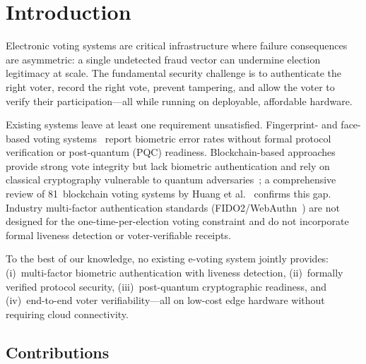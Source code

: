 \documentclass[pdflatex,sn-mathphys-num]{sn-jnl}%
\theoremstyle{thmstyleone}%
\theoremstyle{thmstyletwo}%
\theoremstyle{thmstylethree}%
\begin{document}

\maketitle

\section{Introduction}\label{sec:intro}

Electronic voting systems are critical infrastructure where failure
consequences are asymmetric: a single undetected fraud vector can undermine
election legitimacy at scale. The fundamental security challenge is to
authenticate the right voter, record the right vote, prevent tampering,
and allow the voter to verify their participation---all while running on
deployable, affordable hardware.

Existing systems leave at least one requirement unsatisfied.
Fingerprint- and face-based voting
systems~\cite{bello2021biometric,sanchez2020biometric,komatineni2020biometric,nagaraj2022voting}
report biometric error rates without formal protocol verification or
post-quantum (PQC) readiness. Blockchain-based
approaches~\cite{ayed2017conceptual,hardwick2018voting,faruk2024transforming}
provide strong vote integrity but lack biometric authentication and rely on
classical cryptography vulnerable to quantum
adversaries~\cite{bernstein2017post}; a comprehensive review of 81~blockchain
voting systems by Huang et al.~\cite{huang2022blockchain_voting} confirms this
gap. Industry multi-factor authentication standards
(FIDO2/WebAuthn~\cite{fido2_webauthn}) are not designed for the
one-time-per-election voting constraint and do not incorporate formal liveness
detection or voter-verifiable receipts.

To the best of our knowledge, no existing e-voting system jointly provides:
(i)~multi-factor biometric authentication with liveness detection,
(ii)~formally verified protocol security, (iii)~post-quantum cryptographic
readiness, and (iv)~end-to-end voter verifiability---all on low-cost edge
hardware without requiring cloud connectivity.

\subsection*{Contributions}
\end{document}
